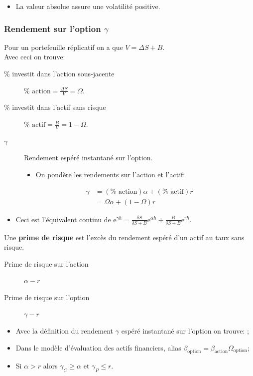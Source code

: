 \documentclass[10pt, french]{article}
\begin{document}
\begin{multicols*}{2}
\begin{itemize}
	\item	La valeur absolue assure une volatilité positive.
\end{itemize}

\subsubsection*{Rendement sur l'option $\gamma$}
Pour un portefeuille réplicatif on a que $V = \Delta S + B$. \\
Avec ceci on trouve:
\begin{description}
	\item[\% investit dans l'action sous-jacente]	$\% \text{ action} = \frac{\Delta S}{V} = \Omega$.
	\item[\% investit dans l'actif sans risque]	$\% \text{ actif} = \frac{B}{V} = 1 - \Omega$.
	\item[$\gamma$]	Rendement espéré instantané sur l'option.
		\begin{itemize}
		\item	On pondère les rendements sur l'action et l'actif:	
		\end{itemize}
		\begin{align*}
		\gamma 
		&=	(\% \text{ action}) \alpha + (\% \text{ actif}) r	\\
		&=	\Omega \alpha + (1 - \Omega) r
		\end{align*}
\end{description}
\begin{itemize}[leftmargin = *]
	\item	Ceci est l'équivalent continu de $\textrm{e}^{\gamma h} = \frac{\delta S}{\delta S + B}\textrm{e}^{\alpha h} + \frac{B}{\delta S + B}\textrm{e}^{r h}$.
\end{itemize}

\begin{definitionNOHFILLsub}
Une \textbf{prime de risque} est l'excès du rendement espéré d'un actif au taux sans risque.
\begin{description}
	\item[Prime de risque sur l'action]	$\alpha - r$
	\item[Prime de risque sur l'option]	$\gamma - r$
\end{description}
\begin{itemize}[leftmargin = *]
	\item	Avec la définition du rendement $\gamma$ espéré instantané sur l'option on trouve: ;
	\item	Dans le modèle d'évaluation des actifs financiers,  alias $\beta_{\text{option}}	=	\beta_{\text{action}} \Omega_{\text{option}}$;
	\item	Si $\alpha > r$ alors $\gamma_{C} \geq \alpha$ et $\gamma_{P} \leq r$.
\end{itemize}
\end{definitionNOHFILLsub}


\end{multicols*}
\end{document}
